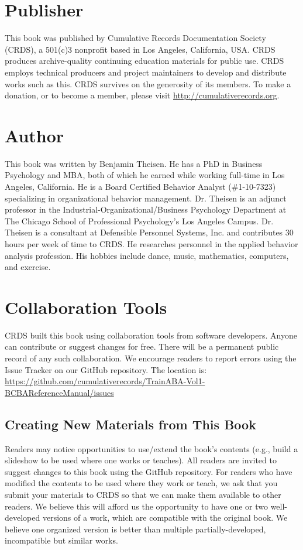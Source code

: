 \section{Publisher}
This book was published by Cumulative Records Documentation Society (CRDS), a 501(c)3 nonprofit based in Los Angeles, California, USA. CRDS produces archive-quality continuing education materials for public use. CRDS employs technical producers and project maintainers to develop and distribute works such as this. CRDS survives on the generosity of its members. To make a donation, or to become a member, please visit \url{http://cumulativerecords.org}.

\section{Author}
This book was written by Benjamin Theisen. He has a PhD in Business Psychology and MBA, both of which he earned while working full-time in Los Angeles, California. He is a Board Certified Behavior Analyst (\#1-10-7323) specializing in organizational behavior management. Dr. Theisen is an adjunct professor in the Industrial-Organizational/Business Psychology Department at The Chicago School of Professional Psychology's Los Angeles Campus. Dr. Theisen is a consultant at Defensible Personnel Systems, Inc. and contributes 30 hours per week of time to CRDS. He researches personnel in the applied behavior analysis profession. His hobbies include dance, music, mathematics, computers, and exercise.

\section{Collaboration Tools}
CRDS built this book using collaboration tools from software developers. Anyone can contribute or suggest changes for free. There will be a permanent public record of any such collaboration. We encourage readers to report errors using the Issue Tracker on our GitHub repository. The location is: \url{https://github.com/cumulativerecords/TrainABA-Vol1-BCBAReferenceManual/issues}

\subsection{Creating New Materials from This Book}
Readers may notice opportunities to use/extend the book's contents (e.g., build a slideshow to be used where one works or teaches). All readers are invited to suggest changes to this book using the GitHub repository. For readers who have modified the contents to be used where they work or teach, we ask that you submit your materials to CRDS so that we can make them available to other readers. We believe this will afford us the opportunity to have one or two well-developed versions of a work, which are compatible with the original book. We believe one organized version is better than multiple partially-developed, incompatible but similar works. 

